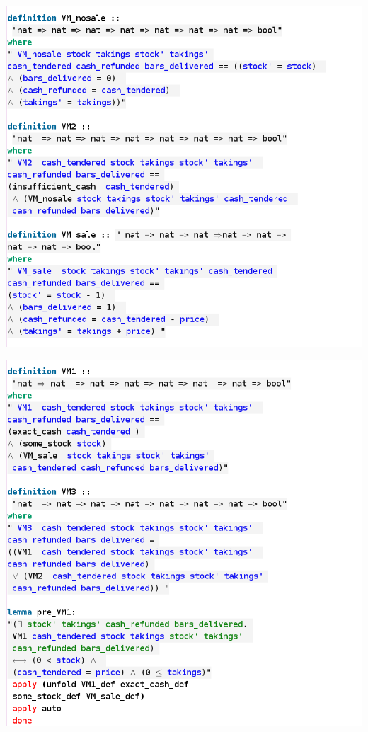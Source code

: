\noindent \includegraphics[scale=0.5]{examples/vm/6imageb.png}

\noindent \includegraphics[scale=0.5]{examples/vm/6imagec.png}

